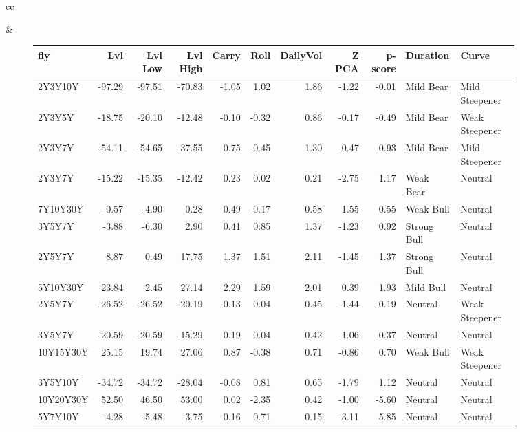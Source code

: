 \documentclass[a4paper,oneside]{report}
\begin{document}
\begin{figure}[htbp]
\begin{tabular}[c]{cc}
 
\begin{subfigure}[c]{0.5\textwidth}
 
 \end{subfigure}&
 
 \begin{subfigure}[c]{0.5\textwidth}
 \begin{adjustbox}{max width=\textwidth}
 \begin{tabular}{lrrrrrrrrll}
\hline
       fly &    Lvl &  Lvl Low &  Lvl High &  Carry &  Roll &  DailyVol &  Z PCA &  p-score &     Duration &           Curve \\
\hline
   2Y3Y10Y & -97.29 &   -97.51 &    -70.83 &  -1.05 &  1.02 &      1.86 &  -1.22 &    -0.01 &    Mild Bear &  Mild Steepener \\
    2Y3Y5Y & -18.75 &   -20.10 &    -12.48 &  -0.10 & -0.32 &      0.86 &  -0.17 &    -0.49 &    Mild Bear &  Weak Steepener \\
    2Y3Y7Y & -54.11 &   -54.65 &    -37.55 &  -0.75 & -0.45 &      1.30 &  -0.47 &    -0.93 &    Mild Bear &  Mild Steepener \\
    2Y3Y7Y & -15.22 &   -15.35 &    -12.42 &   0.23 &  0.02 &      0.21 &  -2.75 &     1.17 &    Weak Bear &         Neutral \\
  7Y10Y30Y &  -0.57 &    -4.90 &      0.28 &   0.49 & -0.17 &      0.58 &   1.55 &     0.55 &    Weak Bull &         Neutral \\
    3Y5Y7Y &  -3.88 &    -6.30 &      2.90 &   0.41 &  0.85 &      1.37 &  -1.23 &     0.92 &  Strong Bull &         Neutral \\
    2Y5Y7Y &   8.87 &     0.49 &     17.75 &   1.37 &  1.51 &      2.11 &  -1.45 &     1.37 &  Strong Bull &         Neutral \\
  5Y10Y30Y &  23.84 &     2.45 &     27.14 &   2.29 &  1.59 &      2.01 &   0.39 &     1.93 &    Mild Bull &         Neutral \\
    2Y5Y7Y & -26.52 &   -26.52 &    -20.19 &  -0.13 &  0.04 &      0.45 &  -1.44 &    -0.19 &      Neutral &  Weak Steepener \\
    3Y5Y7Y & -20.59 &   -20.59 &    -15.29 &  -0.19 &  0.04 &      0.42 &  -1.06 &    -0.37 &      Neutral &         Neutral \\
 10Y15Y30Y &  25.15 &    19.74 &     27.06 &   0.87 & -0.38 &      0.71 &  -0.86 &     0.70 &    Weak Bull &  Weak Steepener \\
   3Y5Y10Y & -34.72 &   -34.72 &    -28.04 &  -0.08 &  0.81 &      0.65 &  -1.79 &     1.12 &      Neutral &         Neutral \\
 10Y20Y30Y &  52.50 &    46.50 &     53.00 &   0.02 & -2.35 &      0.42 &  -1.00 &    -5.60 &      Neutral &         Neutral \\
   5Y7Y10Y &  -4.28 &    -5.48 &     -3.75 &   0.16 &  0.71 &      0.15 &  -3.11 &     5.85 &      Neutral &         Neutral \\
\hline
\end{tabular}
\end{adjustbox}
 \end{subfigure}\\
 

\end{tabular}
\end{figure}
\end{document}
